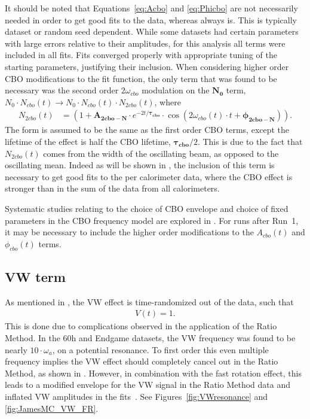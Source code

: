 It should be noted that Equations~\ref{eq:Acbo} and \ref{eq:Phicbo} are not necessarily needed in order to get good fits to the data, whereas  always is. This is typically dataset or random seed dependent. While some datasets had certain parameters with large errors relative to their amplitudes, for this analysis all terms were included in all fits. Fits converged properly with appropriate tuning of the starting parameters, justifying their inclusion. When considering higher order CBO modifications to the fit function, the only term that was found to be necessary was the second order $2\omega_{cbo}$ modulation on the $\boldsymbol{N_{0}}$ term, $N_{0} \cdot N_{cbo}(t) \rightarrow N_{0} \cdot N_{cbo}(t) \cdot  N_{2cbo}(t)$, where
    \begin{align}
        N_{2cbo}(t) &= (1 + \boldsymbol{A_{2cbo-N}} \cdot e^{-2t/\boldsymbol{\tau_{cbo}}} \cdot \cos(2\omega_{cbo}(t) \cdot t + \boldsymbol{\phi_{2cbo-N}})). \label{eq:N2cbo}
    \end{align}
The form is assumed to be the same as the first order CBO terms, except the lifetime of the effect is half the CBO lifetime, $\boldsymbol{\tau_{cbo}}/2$. This is due to the fact that $N_{2cbo}(t)$ comes from the width of the oscillating beam, as opposed to the oscillating mean. Indeed as will be shown in , the inclusion of this term is necessary to get good fits to the per calorimeter data, where the CBO effect is stronger than in the sum of the data from all calorimeters. 




Systematic studies relating to the choice of CBO envelope and choice of fixed parameters in the CBO frequency model are explored in . For runs after Run~1, it may be necessary to include the higher order modifications to the $A_{cbo}(t)$ and $\phi_{cbo}(t)$ terms.



\subsection{VW term}
\label{sub:vw_term}

As mentioned in , the VW effect is time-randomized out of the data, such that 
    \begin{align}
        V(t) = 1. 
    \end{align}
This is done due to complications observed in the application of the Ratio Method. In the 60h and Endgame datasets, the VW frequency was found to be nearly $10 \cdot \omega_{a}$, on a potential resonance. To first order this even multiple frequency implies the VW effect should completely cancel out in the Ratio Method, as shown in . However, in combination with the fast rotation effect, this leads to a modified envelope for the VW signal in the Ratio Method data and inflated VW amplitudes in the fits~\cite{VWinRatio}. See Figures~\ref{fig:VWresonance} and \ref{fig:JamesMC_VW_FR}.


